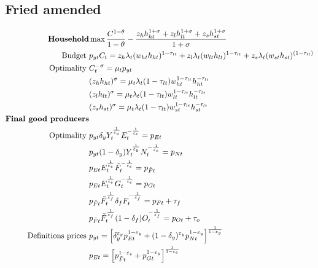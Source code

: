 \subsection{Fried amended}
\begin{align}
\text{\textbf{Household}}& \max \frac{C^{1-\theta}}{1-\theta}-\frac{z_hh_{ht}^{1+\sigma}+z_lh_{lt}^{1+\sigma}+z_sh_{st}^{1+\sigma}}{1+\sigma} %
\\
\text{Budget}\ \vspace{4mm}& p_{yt}C_t=z_h \lambda_t (w_{ht}h_{ht})^{1-\tau_{lt}}+z_l \lambda_t (w_{lt}h_{lt})^{1-\tau_{lt}}+z_s\lambda_t(w_{st}h_{st})^{(1-\tau_{lt})}\\
\text{Optimality}\ \vspace{4mm}
& C_t^{-\sigma}= \mu_tp_{yt}\\
& (z_hh_{ht})^{\sigma}=\mu_t \lambda_t(1-\tau_{lt})w_{ht}^{1-\tau_{lt}}h_{ht}^{-\tau_{lt}}\\
& (z_lh_{lt})^{\sigma}=\mu_t \lambda_t(1-\tau_{lt})w_{lt}^{1-\tau_{lt}}h_{lt}^{-\tau_{lt}}\\
&(z_s h_{st})^{\sigma}=\mu_t \lambda_t(1-\tau_{lt})w_{st}^{1-\tau_{lt}}h_{st}^{-\tau_{lt}}
\\
\text{\textbf{Final good producers}}&\\
\text{Optimality}\ \vspace{4mm}& p_{yt}\delta_yY_t^\frac{1}{\varepsilon_y}E_t^{-\frac{1}{\varepsilon_e}}=p_{Et}\\
& p_{yt}(1-\delta_y)Y_t^\frac{1}{\varepsilon_y}N_t^{-\frac{1}{\varepsilon_e}}=p_{Nt}\\
&
p_{Et}E_t^\frac{1}{\varepsilon_e}\tilde{F}_t^{-\frac{1}{\varepsilon_e}}=p_{\tilde{F}t}\\
& p_{Et}E_t^\frac{1}{\varepsilon_e}G_t^{-\frac{1}{\varepsilon_e}}=p_{Gt}\\
& p_{\tilde{F}t}\tilde{F}_t^\frac{1}{\varepsilon_f}\delta_fF_t^{-\frac{1}{\varepsilon_f}}=p_{Ft}+\tau_{f}\\
& p_{\tilde{F}t}\tilde{F}_t^\frac{1}{\varepsilon_f}(1-\delta_f)O_t^{-\frac{1}{\varepsilon_f}}=p_{Ot}+\tau_{o}
\\
\text{Definitions prices}\ \vspace{4mm}&
p_{yt}= \left[\delta_y^{\varepsilon_y}p_{Et}^{1-\varepsilon_y}+(1-\delta_y)^{\varepsilon_y}p_{Nt}^{1-\varepsilon_y}\right]^\frac{1}{1-\varepsilon_y}\\
& p_{Et}= \left[p_{\tilde{F}t}^{1-\varepsilon_e}+p_{Gt}^{1-\varepsilon_y}\right]^\frac{1}{1-\varepsilon_e}\\

\end{align}
